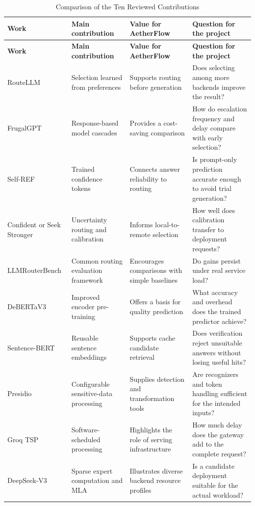 \begingroup
\small
\setlength{\tabcolsep}{4pt}
\renewcommand{\arraystretch}{1.12}
\begin{longtable}{|>{\raggedright\arraybackslash}p{2.5cm}|>{\raggedright\arraybackslash}p{3.5cm}|>{\raggedright\arraybackslash}p{3.9cm}|>{\raggedright\arraybackslash}p{4.7cm}|}
\caption{Comparison of the Ten Reviewed Contributions}\label{tab:lit_summary}\\
\hline
\textbf{Work} & \textbf{Main contribution} & \textbf{Value for AetherFlow} & \textbf{Question for the project} \\ \hline
\endfirsthead
\hline
\textbf{Work} & \textbf{Main contribution} & \textbf{Value for AetherFlow} & \textbf{Question for the project} \\ \hline
\endhead
RouteLLM \cite{ref:RouteLLM} & Selection learned from preferences & Supports routing before generation & Does selecting among more backends improve the result? \\ \hline
FrugalGPT \cite{ref:FrugalGPT} & Response-based model cascades & Provides a cost-saving comparison & How do escalation frequency and delay compare with early selection? \\ \hline
Self-REF \cite{ref:SelfREF} & Trained confidence tokens & Connects answer reliability to routing & Is prompt-only prediction accurate enough to avoid trial generation? \\ \hline
Confident or Seek Stronger \cite{ref:ConfidentOrSeekStronger} & Uncertainty routing and calibration & Informs local-to-remote selection & How well does calibration transfer to deployment requests? \\ \hline
LLMRouter\-Bench \cite{ref:LLMRouterBench} & Common routing evaluation framework & Encourages comparisons with simple baselines & Do gains persist under real service load? \\ \hline
DeBERTaV3 \cite{ref:DeBERTaV3} & Improved encoder pre-training & Offers a basis for quality prediction & What accuracy and overhead does the trained predictor achieve? \\ \hline
Sentence-BERT \cite{ref:SBERT} & Reusable sentence embeddings & Supports cache candidate retrieval & Does verification reject unsuitable answers without losing useful hits? \\ \hline
Presidio \cite{ref:Presidio} & Configurable sensitive-data processing & Supplies detection and transformation tools & Are recognizers and token handling sufficient for the intended inputs? \\ \hline
Groq TSP \cite{ref:GroqTSP} & Software-scheduled processing & Highlights the role of serving infrastructure & How much delay does the gateway add to the complete request? \\ \hline
DeepSeek-V3 \cite{ref:DeepSeekV3} & Sparse expert computation and MLA & Illustrates diverse backend resource profiles & Is a candidate deployment suitable for the actual workload? \\ \hline
\end{longtable}
\endgroup

